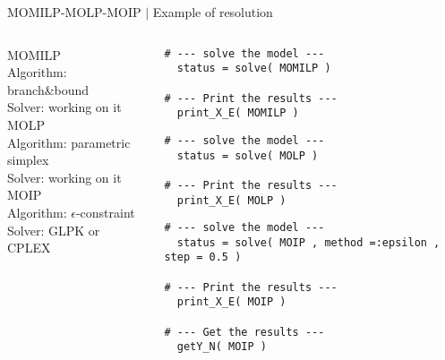 \documentclass[10pt,xcolor=dvipsnames]{beamer}
\newcommand{\grey}{\textcolor{black!25}}
\begin{document}
%
% 
\begin{frame}[fragile=singleslide]{MOMILP-MOLP-MOIP $\mid$ Example of resolution}

{\small
\begin{columns}
\begin{column}{0.33\textwidth}
MOMILP\\
{\scriptsize
Algorithm: branch\&bound\\
Solver: \grey{working on it}\\
}
\vspace{15mm}
MOLP\\
{\scriptsize
Algorithm: parametric simplex\\
Solver: \grey{working on it}\\
}
\vspace{15mm}
MOIP\\
{\scriptsize
Algorithm: $\epsilon$-constraint\\
Solver: GLPK or CPLEX\\
}
\end{column}

\begin{column}{0.66\textwidth}
{\scriptsize
\begin{verbatim}  
# --- solve the model ---
  status = solve( MOMILP )
  
# --- Print the results ---
  print_X_E( MOMILP )
\end{verbatim}
}
\vspace{5mm}
{\scriptsize
\begin{verbatim}  
# --- solve the model ---
  status = solve( MOLP )

# --- Print the results ---
  print_X_E( MOLP )
\end{verbatim}
}
\vspace{5mm}
{\scriptsize
\begin{verbatim}  
# --- solve the model ---
  status = solve( MOIP , method =:epsilon , step = 0.5 )
  
# --- Print the results ---
  print_X_E( MOIP )
  
# --- Get the results ---
  getY_N( MOIP )  
\end{verbatim}
}

\end{column}
\end{columns}
}

\end{frame}
\end{document}
